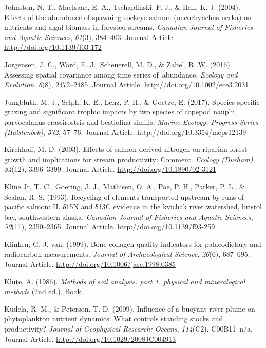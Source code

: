 \documentclass [11pt, proquest] {uwthesis}[2015/03/03]
\begin{document}
\hypertarget{ref-Johnston2004}{}
Johnston, N. T., MacIsaac, E. A., Tschaplinski, P. J., \& Hall, K. J.
(2004). Effects of the abundance of spawning sockeye salmon
(oncorhynchus nerka) on nutrients and algal biomass in forested streams.
\emph{Canadian Journal of Fisheries and Aquatic Sciences}, \emph{61}(3),
384--403. Journal Article. \url{http://doi.org/10.1139/f03-172}

\hypertarget{ref-Jorgensen2016}{}
Jorgensen, J. C., Ward, E. J., Scheuerell, M. D., \& Zabel, R. W.
(2016). Assessing spatial covariance among time series of~abundance.
\emph{Ecology and Evolution}, \emph{6}(8), 2472--2485. Journal Article.
\url{http://doi.org/10.1002/ece3.2031}

\hypertarget{ref-Jungbluth2017}{}
Jungbluth, M. J., Selph, K. E., Lenz, P. H., \& Goetze, E. (2017).
Species-specific grazing and significant trophic impacts by two species
of copepod nauplii, parvocalanus crassirostris and bestiolina similis.
\emph{Marine Ecology. Progress Series (Halstenbek)}, \emph{572}, 57--76.
Journal Article. \url{http://doi.org/10.3354/meps12139}

\hypertarget{ref-Kirchoff2003}{}
Kirchhoff, M. D. (2003). Effects of salmon-derived nitrogen on riparian
forest growth and implications for stream productivity: Comment.
\emph{Ecology (Durham)}, \emph{84}(12), 3396--3399. Journal Article.
\url{http://doi.org/10.1890/02-3121}

\hypertarget{ref-Kline1993}{}
Kline Jr, T. C., Goering, J. J., Mathisen, O. A., Poe, P. H., Parker, P.
L., \& Scalan, R. S. (1993). Recycling of elements transported upstream
by runs of pacific salmon: II. δ15N and δ13C evidence in the kvichak
river watershed, bristol bay, southwestern alaska. \emph{Canadian
Journal of Fisheries and Aquatic Sciences}, \emph{50}(11), 2350--2365.
Journal Article. \url{http://doi.org/10.1139/f93-259}

\hypertarget{ref-vanKlinken1999}{}
Klinken, G. J. van. (1999). Bone collagen quality indicators for
palaeodietary and radiocarbon measurements. \emph{Journal of
Archaeological Science}, \emph{26}(6), 687--695. Journal Article.
\url{http://doi.org/10.1006/jasc.1998.0385}

\hypertarget{ref-Klute1986}{}
Klute, A. (1986). \emph{Methods of soil analysis. part 1. physical and
mineralogical methods} (2nd ed.). Book.

\hypertarget{ref-Kudela2009}{}
Kudela, R. M., \& Peterson, T. D. (2009). Influence of a buoyant river
plume on phytoplankton nutrient dynamics: What controls standing stocks
and productivity? \emph{Journal of Geophysical Research: Oceans},
\emph{114}(C2), C00B11--n/a. Journal Article.
\url{http://doi.org/10.1029/2008JC004913}
\end{document}
